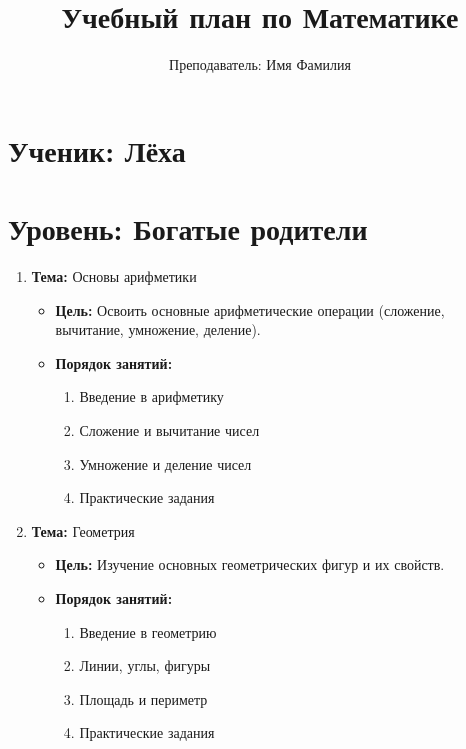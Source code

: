 \documentclass{article}
\begin{document}
\title{Учебный план по Математике}
\author{Преподаватель: Имя Фамилия}
\date{}

\maketitle

\section*{Ученик: Лёха}
\section*{Уровень: Богатые родители}

\begin{enumerate}[label=\textbf{\arabic*.}]

\item \textbf{Тема:} Основы арифметики
    \begin{itemize}
        \item \textbf{Цель:} Освоить основные арифметические операции (сложение, вычитание, умножение, деление).
        \item \textbf{Порядок занятий:}
            \begin{enumerate}
                \item Введение в арифметику
                \item Сложение и вычитание чисел
                \item Умножение и деление чисел
                \item Практические задания
            \end{enumerate}
    \end{itemize}

\item \textbf{Тема:} Геометрия
    \begin{itemize}
        \item \textbf{Цель:} Изучение основных геометрических фигур и их свойств.
        \item \textbf{Порядок занятий:}
            \begin{enumerate}
                \item Введение в геометрию
                \item Линии, углы, фигуры
                \item Площадь и периметр
                \item Практические задания
            \end{enumerate}
    \end{itemize}


\end{enumerate}
\end{document}
